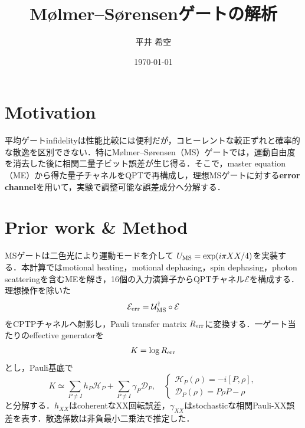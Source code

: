 \documentclass[dvipdfmx,a4paper,10pt,twocolumn]{jsarticle}
\begin{document}
\title{\vspace{-2em}
M{\o}lmer--S{\o}rensenゲートの解析
\vspace{-1em}}
\author{平井 希空}
\date{\today}
\maketitle
\vspace{-3em}

\section{Motivation}

平均ゲートinfidelityは性能比較には便利だが，コヒーレントな較正ずれと確率的な散逸を区別できない．特にM{\o}lmer--S{\o}rensen（MS）ゲートでは，運動自由度を消去した後に相関二量子ビット誤差が生じ得る．そこで，master equation（ME）から得た量子チャネルをQPTで再構成し，理想MSゲートに対する\textbf{error channel}を用いて，実験で調整可能な誤差成分へ分解する．

\section{Prior work \& Method}

MSゲートは二色光により運動モードを介して
$U_{\rm MS}=\exp(i\pi XX/4)$を実装する\cite{MS}．本計算ではmotional heating，motional dephasing，spin dephasing，photon scatteringを含むMEを解き，16個の入力演算子からQPTチャネル$\mathcal E$を構成する\cite{QPT}．理想操作を除いた
\begin{equation}
 \mathcal E_{\rm err}=\mathcal U_{\rm MS}^{\dagger}\circ\mathcal E
 \label{eq:error_channel}
\end{equation}
をCPTPチャネルへ射影し，Pauli transfer matrix $R_{\rm err}$に変換する．一ゲート当たりのeffective generatorを
\begin{equation}
 K=\log R_{\rm err}
 \end{equation}
とし，Pauli基底で
\begin{equation}
 K\simeq\sum_{P\ne I}h_P\mathcal H_P
       +\sum_{P\ne I}\gamma_P\mathcal D_P,
 \quad
 \begin{cases}
 \mathcal H_P(\rho)=-i[P,\rho],\\
 \mathcal D_P(\rho)=P\rho P-\rho
 \end{cases}
 \label{eq:generator}
\end{equation}
と分解する\cite{GST}．$h_{XX}$はcoherentなXX回転誤差，$\gamma_{XX}$はstochasticな相関Pauli-XX誤差を表す．散逸係数は非負最小二乗法で推定した．
\end{document}
